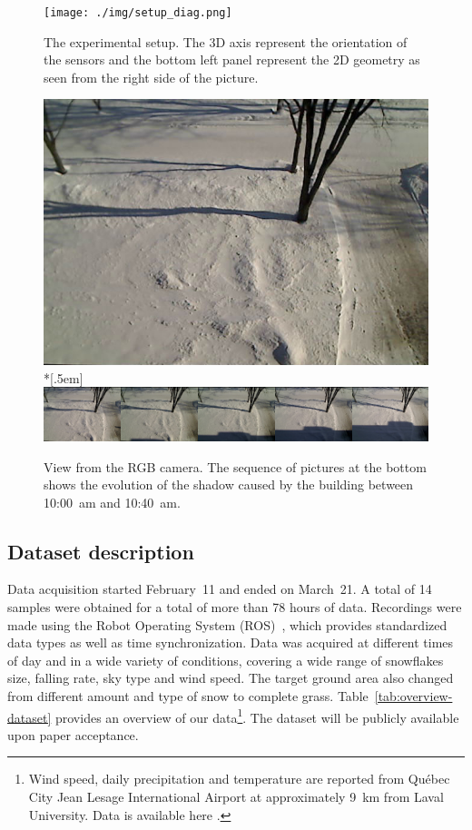 \begin{figure}[th]
    \centering
    \texttt{[image: ./img/setup\_diag.png]}
    \caption{The experimental setup. The 3D axis represent the orientation of the sensors and the bottom left panel represent the 2D geometry as seen from the right side of the picture.}
    \label{fig:setup}
\end{figure}

\begin{figure}[th]
    \centering
    \includegraphics[width=0.90\linewidth]{./img/camera_view.jpg}\\*[.5em]
    \includegraphics[width=0.90\linewidth]{./img/shadow2.png}
    \caption{View from the RGB camera. The sequence of pictures at the bottom shows the evolution of the shadow caused by the building between 10:00~am and 10:40~am.}
    \label{fig:view}
\end{figure}

\subsection{Dataset description} %
Data acquisition started February~11 and ended on March~21. A total of 14 samples were obtained for a total of more than 78 hours of data. Recordings were made using the Robot Operating System (ROS)~\cite{ROSWeb}, which provides standardized data types as well as time synchronization. Data was acquired at different times of day and in a wide variety of conditions, covering a wide range of snowflakes size, falling rate, sky type and wind speed. The target ground area also changed from different amount and type of snow to complete grass. Table~\ref{tab:overview-dataset} provides an overview of our data\footnote{Wind speed, daily precipitation and temperature are reported from Québec City Jean Lesage International Airport at approximately \SI{9}{\km} from Laval University. Data is available here \cite{WeatherCanada}.}. The dataset will be publicly available upon paper acceptance.

